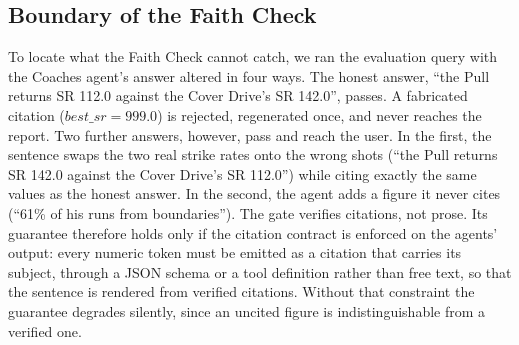 
\subsection{Boundary of the Faith Check}
\label{sec:boundary}

To locate what the Faith Check cannot catch, we ran the evaluation query with
the Coaches agent's answer altered in four ways. The honest answer, ``the Pull
returns SR 112.0 against the Cover Drive's SR 142.0'', passes. A fabricated
citation ($\mathit{best\_sr} = 999.0$) is rejected, regenerated once, and never
reaches the report. Two further answers, however, pass and reach the user. In
the first, the sentence swaps the two real strike rates onto the wrong shots
(``the Pull returns SR 142.0 against the Cover Drive's SR 112.0'') while citing
exactly the same values as the honest answer. In the second, the agent adds a
figure it never cites (``61\% of his runs from boundaries''). The gate verifies
citations, not prose. Its guarantee therefore holds only if the citation
contract is enforced on the agents' output: every numeric token must be emitted
as a citation that carries its subject, through a JSON schema or a tool
definition rather than free text, so that the sentence is rendered from
verified citations. Without that constraint the guarantee degrades silently,
since an uncited figure is indistinguishable from a verified one.
